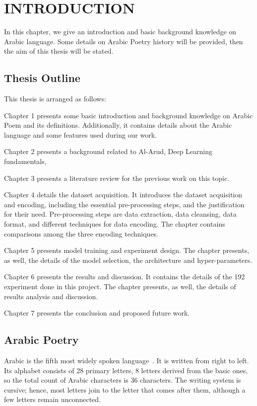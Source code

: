 \chapter{\uppercase{Introduction}}\label{Ch:Intro}
In this chapter, we give an introduction and basic background knowledge on Arabic language. Some details on Arabic Poetry history will be provided, then the aim of this thesis will be stated.

\section{Thesis Outline}
This thesis is arranged as follows:
\begin{enumerate}
	\item Chapter 1 presents some basic introduction and background knowledge on Arabic Poem and its definitions. Additionally, it contains details about the Arabic language and some features used during our work.
	\item Chapter 2 presents a background related to Al-Arud, Deep Learning fundamentals,
	\item Chapter 3 presents a literature review for the previous work on this topic.
	{\color{red}
	\item Chapter 4 details the dataset acquisition. It introduces the
	dataset acquisition and encoding, including the essential pre-processing steps, and the
	justification for their need. Pre-processing steps are data extraction, data cleansing, data
	format, and different techniques for data encoding. The chapter contains comparisons among the
	three encoding techniques. 
	\item Chapter 5 presents model training and experiment design. The chapter presents, as well, the details of the model selection, the
	architecture and hyper-parameters.
	\item Chapter 6 presents the results and discussion. It contains the details of the 192 experiment done in this project. The chapter presents, as well, the details of results analysis and discussion.
	\item Chapter 7 presents the conclusion and proposed future work.
}
\end{enumerate}



\section{Arabic Poetry } %
Arabic is the fifth most widely spoken language~\cite{Ethnologue_2017}. It is written from right to left. Its alphabet consists of 28 primary letters, 8 letters derived from the basic ones, so the total count of Arabic characters is 36 characters. The writing system is cursive; hence, most letters join to the letter that comes after them, although a few letters remain unconnected.


